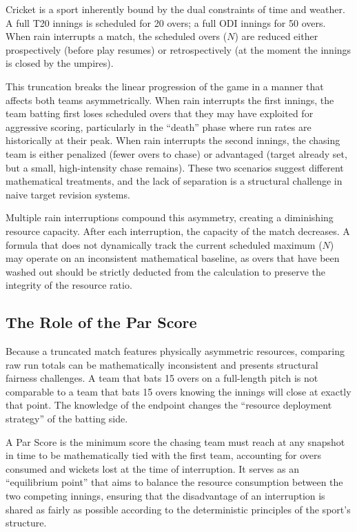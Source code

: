 \documentclass[12pt, letterpaper, fleqn]{article}
\begin{document}
\indent Cricket is a sport inherently bound by the dual constraints of time and weather. A full T20 innings is scheduled for 20 overs; a full ODI innings for 50 overs. When rain interrupts a match, the scheduled overs ($N$) are reduced either prospectively (before play resumes) or retrospectively (at the moment the innings is closed by the umpires). 

\indent This truncation breaks the linear progression of the game in a manner that affects both teams asymmetrically. When rain interrupts the first innings, the team batting first loses scheduled overs that they may have exploited for aggressive scoring, particularly in the ``death'' phase where run rates are historically at their peak. When rain interrupts the second innings, the chasing team is either penalized (fewer overs to chase) or advantaged (target already set, but a small, high-intensity chase remains). These two scenarios suggest different mathematical treatments, and the lack of separation is a structural challenge in naive target revision systems. 

\indent Multiple rain interruptions compound this asymmetry, creating a diminishing resource capacity. After each interruption, the capacity of the match decreases. A formula that does not dynamically track the current scheduled maximum ($N$) may operate on an inconsistent mathematical baseline, as overs that have been washed out should be strictly deducted from the calculation to preserve the integrity of the resource ratio.

\subsection{The Role of the Par Score}

\indent Because a truncated match features physically asymmetric resources, comparing raw run totals can be mathematically inconsistent and presents structural fairness challenges. A team that bats 15 overs on a full-length pitch is not comparable to a team that bats 15 overs knowing the innings will close at exactly that point. The knowledge of the endpoint changes the ``resource deployment strategy'' of the batting side.

\indent A Par Score is the minimum score the chasing team must reach at any snapshot in time to be mathematically tied with the first team, accounting for overs consumed and wickets lost at the time of interruption. It serves as an ``equilibrium point'' that aims to balance the resource consumption between the two competing innings, ensuring that the disadvantage of an interruption is shared as fairly as possible according to the deterministic principles of the sport's structure.
\end{document}
